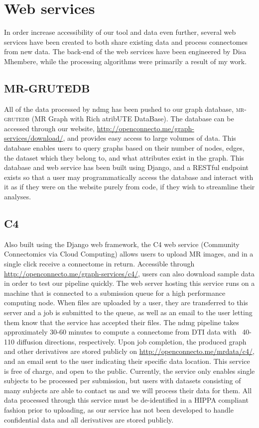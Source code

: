 \section{Web services}
\label{sec:webservices}
In order increase accessibility of our tool and data even further, several web services have been created to both share existing data and process connectomes from new data. The back-end of the web services have been engineered by Disa Mhembere, while the processing algorithms were primarily a result of my work.

\subsection{MR-GRUTEDB}
\label{sec:mrgrutedb}
All of the data processed by ndmg has been pushed to our graph database, \textsc{mr-grutedb} (MR Graph with Rich atribUTE DataBase). The database can be accessed through our website, \url{http://openconnecto.me/graph-services/download/}, and provides easy access to large volumes of data. This database enables users to query graphs based on their number of nodes, edges, the dataset which they belong to, and what attributes exist in the graph. This database and web service has been built using Django, and a RESTful endpoint exists so that a user may programmatically access the database and interact with it as if they were on the website purely from code, if they wish to streamline their analyses.

\subsection{C4}
\label{c4}
Also built using the Django web framework, the C4 web service (Community Connectomics via Cloud Computing) allows users to upload MR images, and in a single click receive a connectome in return. Accessible through \url{http://openconnecto.me/graph-services/c4/}, users can also download sample data in order to test our pipeline quickly. The web server hosting this service runs on a machine that is connected to a submission queue for a high performance computing node. When files are uploaded by a user, they are transferred to this server and a job is submitted to the queue, as well as an email to the user letting them know that the service has accepted their files. The ndmg pipeline takes approximately 30-60 minutes to compute a connectome from DTI data with ~40-110 diffusion directions, respectively. Upon job completion, the produced graph and other derivatives are stored publicly on \url{http://openconnecto.me/mrdata/c4/}, and an email sent to the user indicating their specific data location. This service is free of charge, and open to the public. Currently, the service only enables single subjects to be processed per submission, but users with datasets consisting of many subjects are able to contact us and we will process their data for them. All data processed through this service must be de-identified in a HIPPA compliant fashion prior to uploading, as our service has not been developed to handle confidential data and all derivatives are stored publicly.


